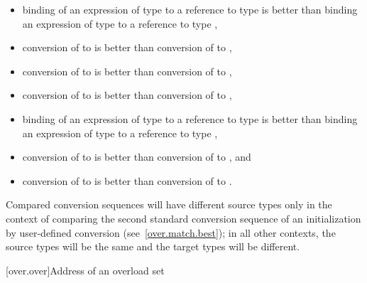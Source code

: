 \begin{itemize}
\begin{itemize}
\item
binding of an expression of type
to a reference to type
is better than binding an expression of type
to a reference to type
,
\item
conversion of
to
is better than conversion of
to
,
\item
conversion of
to
is better than conversion of
to
,
\item
conversion of
to
is better than conversion of
to
,
\item
binding of an expression of type
to a reference to type
is better than binding an expression of type
to a
reference to type
,
\item
conversion of
to
is better than conversion
of
to
,
and
\item
conversion of
to
is better than conversion of
to
.
\end{itemize}

\begin{note}
Compared conversion sequences will have different source types only in the
context of comparing the second standard conversion sequence of an
initialization by user-defined conversion (see~\ref{over.match.best}); in
all other contexts, the source types will be the same and the target
types will be different.
\end{note}
\end{itemize}%
%

[over.over]{Address of an overload set}%
%

